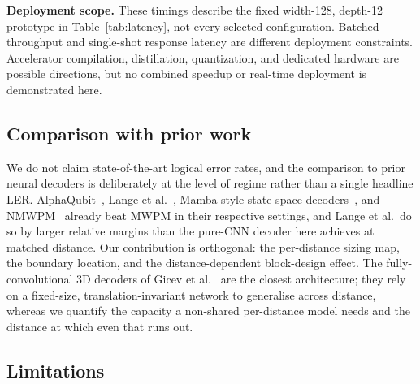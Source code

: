 \documentclass[11pt,a4paper]{article}
\begin{document}
\textbf{Deployment scope.} These timings describe the fixed width-128,
depth-12 prototype in Table~\ref{tab:latency}, not every selected
configuration. Batched throughput and single-shot response latency are
different deployment constraints. Accelerator compilation, distillation,
quantization, and dedicated hardware are possible directions, but no
combined speedup or real-time deployment is demonstrated here.

\subsection{Comparison with prior work}

We do not claim state-of-the-art logical error rates, and the comparison to
prior neural decoders is deliberately at the level of regime rather than a
single headline LER. AlphaQubit~\cite{bausch2024alphaqubit}, Lange et
al.~\cite{lange2025gnn}, Mamba-style state-space
decoders~\cite{lee2025mamba}, and NMWPM~\cite{peled2026nmwpm} already beat
MWPM in their respective settings, and Lange et al.\ do so by larger
relative margins than the pure-CNN decoder here achieves at matched
distance. Our contribution is orthogonal: the per-distance sizing map, the
boundary location, and the distance-dependent block-design effect. The
fully-convolutional 3D decoders of Gicev et al.~\cite{gicev2025fcn}
are the closest architecture; they rely on a fixed-size,
translation-invariant network to generalise across distance, whereas we
quantify the capacity a non-shared per-distance model needs and the
distance at which even that runs out.

\subsection{Limitations}
\end{document}
